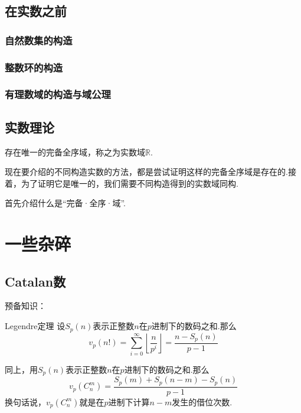 \documentclass[lang=cn, zihao=5]{elegantbook}
\newcommand{\R}{\mathbb{R}}
\begin{document}
\chapter{在实数之前}

\section{自然数集的构造}

\section{整数环的构造}

\section{有理数域的构造与域公理}

\chapter{实数理论}

\begin{theorem}
	存在唯一的完备全序域，称之为实数域$\R$.
\end{theorem}

现在要介绍的不同构造实数的方法，都是尝试证明这样的完备全序域是存在的.接着，为了证明它是唯一的，我们需要不同构造得到的实数域同构.

首先介绍什么是“完备·全序·域”.




\setcounter{chapter}{0}
\part{一些杂碎}

\chapter*{Catalan数}

预备知识：

\begin{theorem}{Legendre定理}
	设$S_p(n)$表示正整数$n$在$p$进制下的数码之和.那么$$v_p(n!) = \sum_{i=0}^{\infty} \left\lfloor \frac{n}{p^i} \right\rfloor = \frac{n-S_p(n)}{p-1}$$
\end{theorem}

\begin{corollary}
	同上，用$S_p(n)$表示正整数$n$在$p$进制下的数码之和.那么$$v_p(C_n^m) = \frac{S_p(m)+S_p(n-m)-S_p(n)}{p-1}$$
	换句话说，$v_p(C_n^m)$就是在$p$进制下计算$n-m$发生的借位次数.
\end{corollary}
\end{document}
